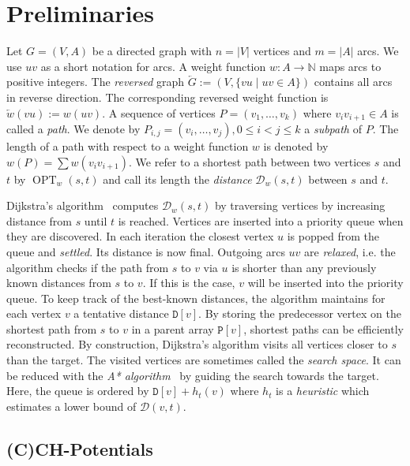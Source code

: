 \documentclass[a4paper,UKenglish,cleveref, autoref, thm-restate]{lipics-v2021}
\newcommand*{\dist}{\mathcal{D}}
\newcommand*{\shp}{\operatorname{OPT}}
\begin{document}
\section{Preliminaries}
\label{sec:prelim}

Let $G=(V,A)$ be a directed graph with $n = |V|$ vertices and $m = |A|$ arcs.
We use $uv$ as a short notation for arcs.
A weight function $w : A \to \mathbb{N}$ maps arcs to positive integers.
The \emph{reversed} graph $\overleftarrow{G} := (V, \{ vu \mid uv \in A \})$ contains all arcs in reverse direction.
The corresponding reversed weight function is $\overleftarrow{w}(vu) := w(uv)$.
A sequence of vertices $P = (v_1, \dots, v_k)$ where $v_i v_{i+1} \in A$ is called a \emph{path}.
We denote by $P_{i,j} = (v_i, \dots, v_j), 0 \leq i < j \leq k$ a \emph{subpath} of $P$.
The length of a path with respect to a weight function $w$ is denoted by $w(P) = \sum w(v_i v_{i+1})$.
We refer to a shortest path between two vertices $s$ and $t$ by $\shp_w(s,t)$ and call its length the \emph{distance} $\dist_w(s,t)$ between $s$ and $t$.

Dijkstra's algorithm~\cite{d-ntpcg-59} computes $\dist_w(s,t)$ by traversing vertices by increasing distance from $s$ until $t$ is reached.
Vertices are inserted into a priority queue when they are discovered.
In each iteration the closest vertex $u$ is popped from the queue and \emph{settled}.
Its distance is now final.
Outgoing arcs $uv$ are \emph{relaxed}, i.e. the algorithm checks if the path from $s$ to $v$ via $u$ is shorter than any previously known distances from $s$ to $v$.
If this is the case, $v$ will be inserted into the priority queue.
To keep track of the best-known distances, the algorithm maintains for each vertex $v$ a tentative distance $\mathtt{D}[v]$.
By storing the predecessor vertex on the shortest path from $s$ to $v$ in a parent array $\mathtt{P}[v]$, shortest paths can be efficiently reconstructed.
By construction, Dijkstra's algorithm visits all vertices closer to $s$ than the target.
The visited vertices are sometimes called the \emph{search space}.
It can be reduced with the \emph{A* algorithm}~\cite{hnr-afbhd-68} by guiding the search towards the target.
Here, the queue is ordered by $\mathtt{D}[v] + h_t(v)$ where $h_t$ is a \emph{heuristic} which estimates a lower bound of $\dist(v,t)$.

\subsection{(C)CH-Potentials}
\end{document}
